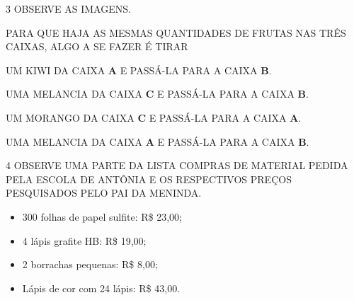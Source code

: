 \num{3} OBSERVE AS IMAGENS.





PARA QUE HAJA AS MESMAS QUANTIDADES DE FRUTAS NAS TRÊS CAIXAS, ALGO
A SE FAZER É TIRAR

\begin{escolha}
\item UM KIWI DA CAIXA \textbf{A} E PASSÁ-LA PARA A CAIXA \textbf{B}.

\item UMA MELANCIA DA CAIXA \textbf{C} E PASSÁ-LA PARA A CAIXA \textbf{B}.

\item UM MORANGO DA CAIXA \textbf{C} E PASSÁ-LA PARA A CAIXA \textbf{A}.

\item UMA MELANCIA DA CAIXA \textbf{A} E PASSÁ-LA PARA A CAIXA \textbf{B}.
\end{escolha}




\num{4} OBSERVE UMA PARTE DA LISTA COMPRAS DE MATERIAL PEDIDA PELA ESCOLA DE ANTÔNIA E OS RESPECTIVOS PREÇOS PESQUISADOS PELO PAI DA MENINDA.

\begin{itemize}
  \item 300 folhas de papel sulfite: R\$ 23,00;
  \item 4 lápis grafite HB: R\$ 19,00;
  \item 2 borrachas pequenas: R\$ 8,00;
  \item Lápis de cor com 24 lápis: R\$ 43,00.
\end{itemize}

